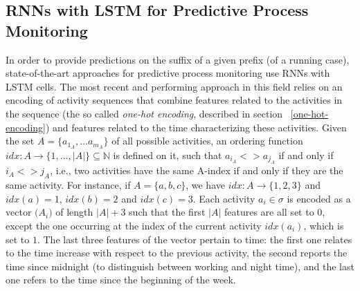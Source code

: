 \subsection{RNNs with LSTM for Predictive Process Monitoring}
\label{subsec:RNNforpredictive}
In order to provide predictions on the suffix of a given prefix (of a running case), state-of-the-art approaches for predictive process monitoring use RNNs with LSTM cells.  The most recent and performing approach in this field \cite{niek96732} relies on an encoding of activity sequences that combine features related to the activities in the sequence (the so called \textit{one-hot encoding}, described in section ~\ref{one-hot-encoding}) and features related to the time characterizing these activities. Given the set $A = \{a_{1_A}, \ldots a_{m_A}\}$ of all possible activities, an ordering function $idx:A \rightarrow \{1, \ldots, \left|A\right| \} \subseteq \mathbb{N}$ is defined on it, such that $a_{i_A}<>a_{j_A}$ if and only if $i_A<>j_A$, i.e., two activities have the same A-index if and only if they are the same activity. For instance, if $A=\{a,b,c\}$, we have $idx: A \rightarrow \{1,2,3\}$ and $idx(a)=1$, $idx(b)=2$ and $idx(c)=3$. Each activity $a_i \in \sigma$ is encoded as a vector $\mathbb(A_i)$ of length $|A|+3$ such that the first $|A|$ features are all set to $0$, except the one occurring at the index of the current activity $idx(a_i)$, which is set to $1$. The last three features of the vector pertain to time: the first one relates to the time increase with respect to the previous activity, the second reports the time since midnight (to distinguish between working and night time), and the last one refers to the time since the beginning of the week.

